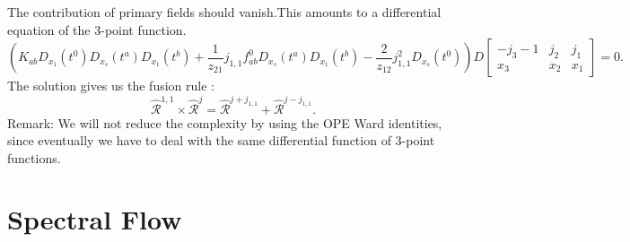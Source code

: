 \documentclass[10pt,a4paper]{article}
\numberwithin{equation}{section}
\begin{document}
The contribution of primary fields should vanish.This amounts to a differential equation of the 3-point function.
\begin{equation}
    \left( K_{a b} D_{x_1}\left(t^0\right) D_{x_s}\left(t^a\right) D_{x_1}\left(t^b\right)+ \frac{1}{z_{21}}j_{1,1} f_{a b}^0 D_{x_s}\left(t^a\right) D_{x_1}\left(t^b\right) 
    - \frac{2}{z_{12}} j_{1,1}^2 D_{x_s}\left(t^0\right) \right) D \left[\begin{array}{ccc}
    -j_3 -1 & j_2 & j_1 \\
    x_3 & x_2 & x_1
    \end{array} \right] = 0.
\end{equation}
The solution gives us the fusion rule \cite{Stocco:2022gah}:
\begin{equation}
    \hat{\mathcal{R}}^{1,1} \times \hat{\mathcal{R}}^{j} = \hat{\mathcal{R}}^{j+j_{1,1}} + \hat{\mathcal{R}}^{j-j_{1,1}}.
\end{equation}
Remark: We will not reduce the complexity by using the OPE Ward identities, since eventually we have to deal with the same differential function 
of 3-point functions.

\section{Spectral Flow}
\end{document}
